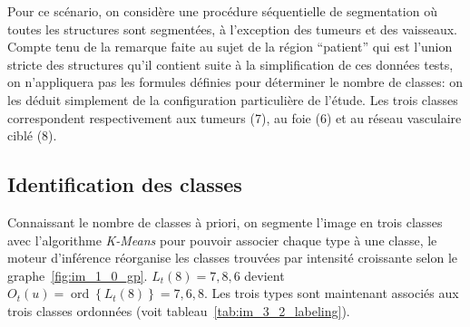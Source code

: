 	Pour ce scénario, on considère une procédure séquentielle de segmentation où toutes les structures sont segmentées, à l'exception des tumeurs et des vaisseaux. Compte tenu de la remarque faite au sujet de la région ``patient'' qui est l'union stricte des structures qu'il contient suite à la simplification de ces données tests, on n'appliquera pas les formules définies pour déterminer le nombre de classes: on les déduit simplement de la configuration particulière de l'étude. Les trois classes correspondent respectivement aux tumeurs (7), au foie (6) et au réseau vasculaire ciblé (8).

			\subsection{Identification des classes}
	 Connaissant le nombre de classes à priori, on segmente l'image en trois classes avec l'algorithme \emph{K-Means} pour pouvoir associer chaque type à une classe, le moteur d'inférence réorganise les classes trouvées par intensité croissante selon le graphe~\ref{fig:im_1_0_gp}. $L_t(8) = {7,8,6}$ devient $O_t(u)= \operatorname{ord} \left\{ L_t(8) \right\} = {7,6,8}$. Les trois types sont maintenant associés aux trois classes ordonnées (voit tableau~\ref{tab:im_3_2_labeling}).

						


